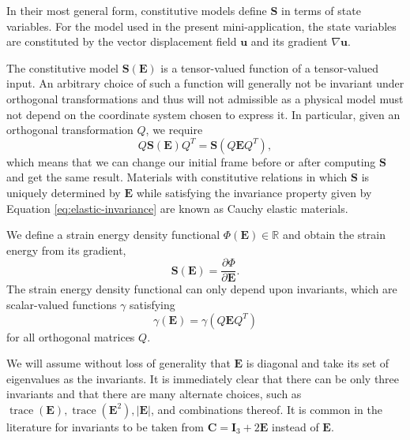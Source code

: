 In their most general form, constitutive models define $\mathbf S$ in terms of state variables.
For the model used in the present mini-application, the state variables are constituted by the vector displacement field $\mathbf u$ and its gradient $\nabla \mathbf u$.

The constitutive model $\mathbf S \left( \mathbf E \right)$ is a tensor-valued function of a tensor-valued input.
An arbitrary choice of such a function will generally not be invariant under orthogonal transformations and thus will not admissible as a physical model must not depend on the coordinate system chosen to express it.
In particular, given an orthogonal transformation $Q$, we require
\begin{equation}
   Q \mathbf S \left( \mathbf E \right) Q^T = \mathbf S \left( Q \mathbf E Q^T \right),
   \label{eq:elastic-invariance}
\end{equation}
which means that we can change our initial frame before or after computing $\mathbf S$ and get the same result.
Materials with constitutive relations in which $\mathbf S$ is uniquely determined by $\mathbf E$ while satisfying the invariance property given by Equation \ref{eq:elastic-invariance} are known as Cauchy elastic materials.

We define a strain energy density functional $\Phi \left( \mathbf E \right) \in \mathbb{R}$ and obtain the strain energy from its gradient,
\begin{equation}
\mathbf S \left( \mathbf E \right) = \frac{\partial \Phi}{\partial \mathbf E}.
\label{eq:strain-energy-grad}
\end{equation}
The strain energy density functional can only depend upon invariants, which are scalar-valued functions $\gamma$ satisfying
\begin{equation}
\gamma \left( \mathbf E \right) = \gamma \left( Q \mathbf{E} Q^T \right)
\end{equation}
for all orthogonal matrices $Q$.

We will assume without loss of generality that $\mathbf E$ is diagonal and take its set of eigenvalues as the invariants.
It is immediately clear that there can be only three invariants and that there are many alternate choices, such as $\operatorname{trace}(\mathbf E), \operatorname{trace}(\mathbf E^2), \lvert \mathbf E \rvert$, and combinations thereof.
It is common in the literature for invariants to be taken from $\mathbf C = \mathbf I_3 + 2 \mathbf E$ instead of $\mathbf E$.

